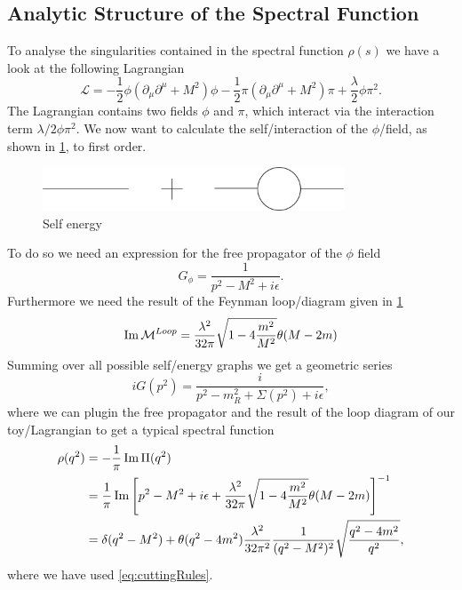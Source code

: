 \documentclass[../../index.tex]{subfiles}
\begin{document}
\subsection{Analytic Structure of the Spectral Function}
To analyse the singularities contained in the spectral function $\rho(s)$ we
have a look at the following Lagrangian
\begin{equation}
  \mathcal{L} = -\frac{1}{2} \phi(\partial_\mu \partial^\mu + M^2) \phi - \frac{1}{2}\pi(\partial_\mu\partial^\mu + M^2)\pi + \frac{\lambda}{2}{\phi\pi^2}.
\end{equation}
The Lagrangian contains two fields $\phi$ and $\pi$, which interact via the
interaction term $\lambda/2 \phi \pi^2$. We now want to calculate the
self\-/interaction of the $\phi$\-/field, as shown in
\cref{fig:twoPointFunctionSelfEnergy}, to first order.
\begin{figure}
  \centering
  \includegraphics[width=0.8\textwidth]{./images/twoPointFunctionSelfEnergy}
  \caption{Self energy}
  \label{fig:twoPointFunctionSelfEnergy}
\end{figure}
To do so we need an expression for the free propagator of the $\phi$ field
\begin{equation}
  G_\phi = \frac{1}{p^2-M^2+i\epsilon}.
\end{equation}
Furthermore we need the result of the Feynman loop\-/diagram given in
\cref{fig:twoPointFunctionSelfEnergy}
\begin{equation}
  \operatorname{Im} \mathcal{M}^{Loop} = \frac{\lambda^2}{32 \pi} \sqrt{1 - 4\frac{m^2}{M^2}} \theta(M - 2m)
\end{equation}
Summing over all possible self\-/energy graphs we get a geometric series
\begin{equation}
  i G(p^2) = \frac{i}{p^2 - m_R^2 + \Sigma(p^2) + i\epsilon },
\end{equation}
where we can plugin the free propagator and the result of the loop diagram of
our toy\-/Lagrangian to get a typical spectral function
\begin{equation}
  \begin{split}
    \rho(q^2) &= -\frac{1}{\pi} \operatorname{Im} \Pi(q^2) \\
    &= \frac{1}{\pi} \operatorname{Im} \left[ p^2 - M^2 + i\epsilon + \frac{\lambda^2}{32 \pi} \sqrt{1 - 4\frac{m^2}{M^2}} \theta(M - 2m) \right]^{-1} \\
    &= \delta(q^2 - M^2) + \theta(q^2 - 4m^2)\frac{\lambda^2}{32 \pi^2}
    \frac{1}{(q^2 - M^2)^2} \sqrt{\frac{q^2 - 4m^2}{q^2}},
  \end{split}
\end{equation}
where we have used \cref{eq:cuttingRules}.
\end{document}
